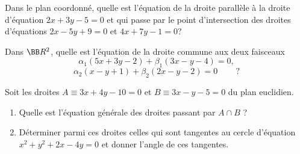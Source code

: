 \documentclass[12pt,french,oneside,a4paper]{memoir} %
\begin{document}
\begin{exo}
  Dans le plan coordonné, quelle est l'équation de la droite parallèle à la droite d'équation $2x+3y-5=0$ et qui passe par le point d'intersection des droites d'équations $2x-5y+9=0$ et $4x+7y-1=0$?
\end{exo}
\begin{exo}
Dans $\BB R^2$, quelle est l'équation de la droite commune aux deux faisceaux
\begin{equation*}
\alpha_1(5x+3y-2)+ \beta_1(3x-y-4)=0,
\end{equation*}
\begin{equation*}
\alpha_2(x-y+1) + \beta_2(2x-y-2)=0 \,\qquad ?
\end{equation*}
\end{exo}
\begin{exo}
Soit les droites $A \equiv 3x+4y-10=0$ et $B \equiv 3x-y-5=0$ du plan 
euclidien.
\begin{enumerate}
\item Quelle est l'équation générale des droites passant par 
$A \cap B$ ? 
\item Déterminer parmi ces droites celles qui sont tangentes au 
cercle d'équation $x^2+y^2+2x-4y=0$ et donner l'angle de ces tangentes. 
\end{enumerate}
\end{exo}
\end{document}
